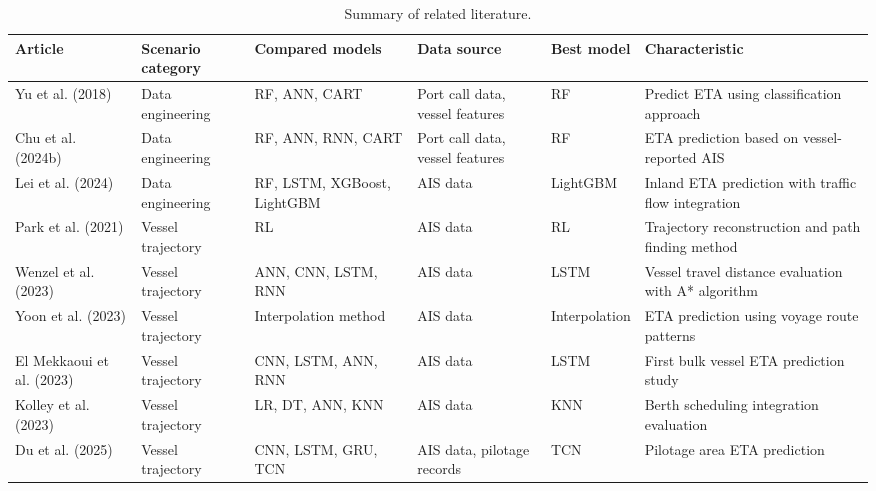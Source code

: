 \documentclass[conference]{IEEEtran}
\begin{document}
\begin{table}[htbp]
\centering
\caption{Summary of related literature.}
\label{tab:related_literature}
\footnotesize
\setlength{\tabcolsep}{4pt}
\renewcommand{\arraystretch}{1.15}

\begin{tabular}{P{2.3cm} P{2.0cm} P{2.2cm} P{2.2cm} P{1.5cm} P{3.6cm}}
\toprule
\textbf{Article} & \textbf{Scenario category} & \textbf{Compared models} & \textbf{Data source} & \textbf{Best model} & \textbf{Characteristic} \\
\midrule
Yu et al. (2018)\cite{yuShipArrivalPrediction2018} & Data engineering & RF, ANN, CART & Port call data, vessel features & RF & Predict ETA using classification approach \\

Chu et al. (2024b)\cite{chuEvaluationPredictionPunctuality2023} & Data engineering & RF, ANN, RNN, CART & Port call data, vessel features & RF & ETA prediction based on vessel-reported AIS \\

Lei et al. (2024)\cite{leiPredictingVesselArrival2024} & Data engineering & RF, LSTM, XGBoost, LightGBM & AIS data & LightGBM & Inland ETA prediction with traffic flow integration \\

Park et al. (2021)\cite{parkVesselEstimatedTime2021}  & Vessel trajectory & RL & AIS data & RL & Trajectory reconstruction and path finding method \\

Wenzel et al. (2023)\cite{wenzelNeuralNetworkApproach2023} & Vessel trajectory & ANN, CNN, LSTM, RNN & AIS data & LSTM & Vessel travel distance evaluation with A* algorithm \\

Yoon et al. (2023)\cite{yoonEnhancingContainerVessel2023} & Vessel trajectory & Interpolation method & AIS data & Interpolation & ETA prediction using voyage route patterns \\

El Mekkaoui et al. (2023)\cite{elmekkaouiDeepLearningModels2022} & Vessel trajectory & CNN, LSTM, ANN, RNN & AIS data & LSTM & First bulk vessel ETA prediction study \\

Kolley et al. (2023)\cite{kolleyRobustBerthScheduling2022} & Vessel trajectory & LR, DT, ANN, KNN & AIS data & KNN & Berth scheduling integration evaluation \\

Du et al. (2025)\cite{duSegmentedETAPrediction2025} & Vessel trajectory & CNN, LSTM, GRU, TCN & AIS data, pilotage records & TCN & Pilotage area ETA prediction \\
\bottomrule
\end{tabular}
\end{table}
\end{document}
